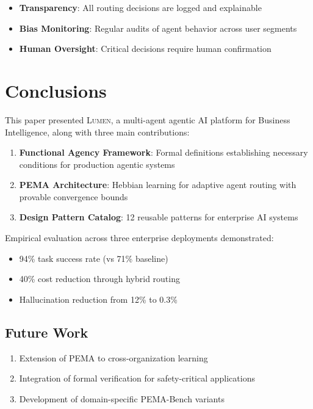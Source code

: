 \documentclass[11pt,a4paper]{article}
\theoremstyle{definition}
\theoremstyle{remark}
\newcommand{\lumen}{\textsc{Lumen}\xspace}
\newcommand{\pema}{\textsc{PEMA}\xspace}
\begin{document}
\begin{itemize}
    \item \textbf{Transparency}: All routing decisions are logged and explainable
    \item \textbf{Bias Monitoring}: Regular audits of agent behavior across user segments
    \item \textbf{Human Oversight}: Critical decisions require human confirmation
\end{itemize}


\section{Conclusions}
\label{sec:conclusions}

This paper presented \lumen, a multi-agent agentic AI platform for Business Intelligence, along with three main contributions:

\begin{enumerate}
    \item \textbf{Functional Agency Framework}: Formal definitions establishing necessary conditions for production agentic systems

    \item \textbf{\pema Architecture}: Hebbian learning for adaptive agent routing with provable convergence bounds

    \item \textbf{Design Pattern Catalog}: 12 reusable patterns for enterprise AI systems
\end{enumerate}

Empirical evaluation across three enterprise deployments demonstrated:
\begin{itemize}
    \item 94\% task success rate (vs 71\% baseline)
    \item 40\% cost reduction through hybrid routing
    \item Hallucination reduction from 12\% to 0.3\%
\end{itemize}

\subsection{Future Work}

\begin{enumerate}
    \item Extension of \pema to cross-organization learning
    \item Integration of formal verification for safety-critical applications
    \item Development of domain-specific PEMA-Bench variants
\end{enumerate}
\end{document}
